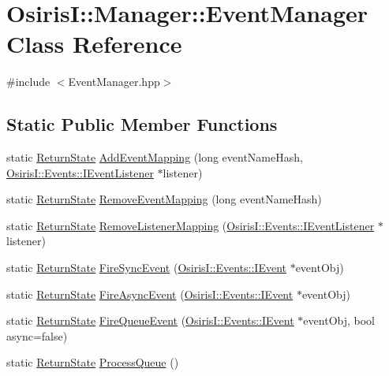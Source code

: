 \hypertarget{class_osiris_i_1_1_manager_1_1_event_manager}{\section{Osiris\-I\-:\-:Manager\-:\-:Event\-Manager Class Reference}
\label{class_osiris_i_1_1_manager_1_1_event_manager}
}


{\ttfamily \#include $<$Event\-Manager.\-hpp$>$}

\subsection*{Static Public Member Functions}
\begin{DoxyCompactItemize}
\item 
static \hyperlink{namespace_osiris_i_a8f53bf938dc75c65c6a529694514013e}{Return\-State} \hyperlink{class_osiris_i_1_1_manager_1_1_event_manager_a73f7de75e10a471d5b944e9840ba5cf8}{Add\-Event\-Mapping} (long event\-Name\-Hash, \hyperlink{class_osiris_i_1_1_events_1_1_i_event_listener}{Osiris\-I\-::\-Events\-::\-I\-Event\-Listener} $\ast$listener)
\item 
static \hyperlink{namespace_osiris_i_a8f53bf938dc75c65c6a529694514013e}{Return\-State} \hyperlink{class_osiris_i_1_1_manager_1_1_event_manager_ac933aa2df48e01f3ce65c20c86811c50}{Remove\-Event\-Mapping} (long event\-Name\-Hash)
\item 
static \hyperlink{namespace_osiris_i_a8f53bf938dc75c65c6a529694514013e}{Return\-State} \hyperlink{class_osiris_i_1_1_manager_1_1_event_manager_a7172228aefdc09d9da67c0ee65fd078c}{Remove\-Listener\-Mapping} (\hyperlink{class_osiris_i_1_1_events_1_1_i_event_listener}{Osiris\-I\-::\-Events\-::\-I\-Event\-Listener} $\ast$listener)
\item 
static \hyperlink{namespace_osiris_i_a8f53bf938dc75c65c6a529694514013e}{Return\-State} \hyperlink{class_osiris_i_1_1_manager_1_1_event_manager_a111ed838eca66571fb6451f5e9eb905f}{Fire\-Sync\-Event} (\hyperlink{struct_osiris_i_1_1_events_1_1_i_event}{Osiris\-I\-::\-Events\-::\-I\-Event} $\ast$event\-Obj)
\item 
static \hyperlink{namespace_osiris_i_a8f53bf938dc75c65c6a529694514013e}{Return\-State} \hyperlink{class_osiris_i_1_1_manager_1_1_event_manager_a4e2c4c39aabd59ba0eef606677938aef}{Fire\-Async\-Event} (\hyperlink{struct_osiris_i_1_1_events_1_1_i_event}{Osiris\-I\-::\-Events\-::\-I\-Event} $\ast$event\-Obj)
\item 
static \hyperlink{namespace_osiris_i_a8f53bf938dc75c65c6a529694514013e}{Return\-State} \hyperlink{class_osiris_i_1_1_manager_1_1_event_manager_a2b07aaa237d31260d7b711e7d3dd6852}{Fire\-Queue\-Event} (\hyperlink{struct_osiris_i_1_1_events_1_1_i_event}{Osiris\-I\-::\-Events\-::\-I\-Event} $\ast$event\-Obj, bool async=false)
\item 
static \hyperlink{namespace_osiris_i_a8f53bf938dc75c65c6a529694514013e}{Return\-State} \hyperlink{class_osiris_i_1_1_manager_1_1_event_manager_a7dfb8d469813bbf35414934c5a4cc63b}{Process\-Queue} ()
\end{DoxyCompactItemize}


